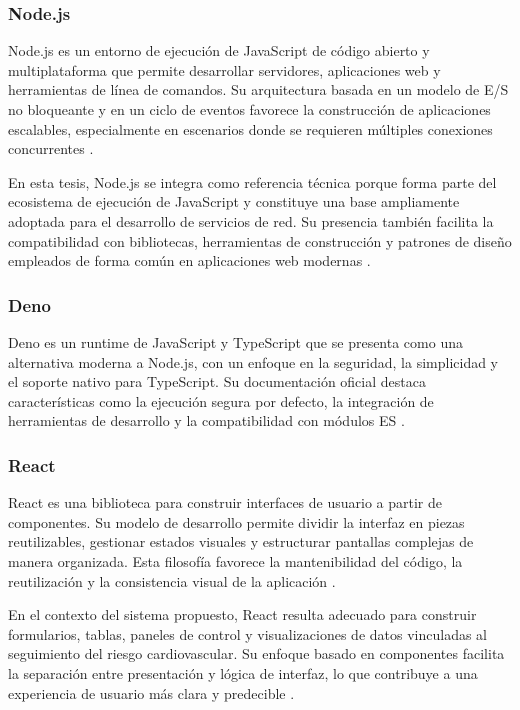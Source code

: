 \subsubsection{Node.js}

Node.js es un entorno de ejecución de JavaScript de código abierto y multiplataforma que permite desarrollar servidores, aplicaciones web y herramientas de línea de comandos. Su arquitectura basada en un modelo de E/S no bloqueante y en un ciclo de eventos favorece la construcción de aplicaciones escalables, especialmente en escenarios donde se requieren múltiples conexiones concurrentes \cite{nodejs2025docs,nodejs2025eventloop}.

En esta tesis, Node.js se integra como referencia técnica porque forma parte del ecosistema de ejecución de JavaScript y constituye una base ampliamente adoptada para el desarrollo de servicios de red. Su presencia también facilita la compatibilidad con bibliotecas, herramientas de construcción y patrones de diseño empleados de forma común en aplicaciones web modernas \cite{nodejs2025docs}.

\subsubsection{Deno}
Deno es un runtime de JavaScript y TypeScript que se presenta como una alternativa moderna a Node.js, con un enfoque en la seguridad, la simplicidad y el soporte nativo para TypeScript. Su documentación oficial destaca características como la ejecución segura por defecto, la integración de herramientas de desarrollo y la compatibilidad con módulos ES \cite{deno2025docs}.

\subsubsection{React}

React es una biblioteca para construir interfaces de usuario a partir de componentes. Su modelo de desarrollo permite dividir la interfaz en piezas reutilizables, gestionar estados visuales y estructurar pantallas complejas de manera organizada. Esta filosofía favorece la mantenibilidad del código, la reutilización y la consistencia visual de la aplicación \cite{react2025docs}.

En el contexto del sistema propuesto, React resulta adecuado para construir formularios, tablas, paneles de control y visualizaciones de datos vinculadas al seguimiento del riesgo cardiovascular. Su enfoque basado en componentes facilita la separación entre presentación y lógica de interfaz, lo que contribuye a una experiencia de usuario más clara y predecible \cite{react2025docs,mdn2025accessibility}.

